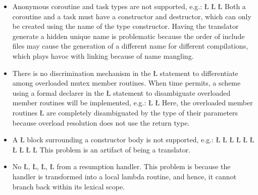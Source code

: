 \documentclass[openright,twoside]{report}
\begin{document}
\begin{itemize}
\item
Anonymous coroutine and task types are not supported, e.g.:
\LGinlinefalse\LGbegin\lgrinde
\L{}
\CE{}\L{\LB{}}
\L{}
\endlgrinde\LGend
Both a coroutine and a task must have a constructor and destructor, which can only be created using the name of the type constructor.
Having the translator generate a hidden unique name is problematic because the order of include files may cause the generation of a different name for different compilations, which plays havoc with linking because of name mangling.

\item
There is no discrimination mechanism in the \LGinlinetrue\LGbegin\lgrinde\L{}\endlgrinde\LGend{} statement to differentiate among overloaded mutex member routines.
When time permits, a scheme using a formal declarer in the \LGinlinetrue\LGbegin\lgrinde\L{}\endlgrinde\LGend{} statement to disambiguate overloaded member routines will be implemented, e.g.:
\LGinlinefalse\LGbegin\lgrinde
\L{}
\L{}
\endlgrinde\LGend
Here, the overloaded member routines \LGinlinetrue\LGbegin\lgrinde\L{}\endlgrinde\LGend{} are completely disambiguated by the type of their parameters because \CC overload resolution does not use the return type.

\item
A \LGinlinetrue\LGbegin\lgrinde\L{}\endlgrinde\LGend{} block surrounding a constructor body is not supported, e.g.:
\LGinlinefalse\LGbegin\lgrinde
\L{}
\L{\LB{}}
\L{}
\L{\LB{}}
\CE{}\L{\LB{\};}}
\L{}
\L{\LB{}}
\CE{}\L{}
\L{\LB{}}
\CE{}\L{\LB{\}}}
\endlgrinde\LGend
This problem is an artifact of \uC being a translator.
\item
No \LGinlinetrue\LGbegin\lgrinde\L{}\endlgrinde\LGend{}, \LGinlinetrue\LGbegin\lgrinde\L{}\endlgrinde\LGend{}, \LGinlinetrue\LGbegin\lgrinde\L{}\endlgrinde\LGend{}, \LGinlinetrue\LGbegin\lgrinde\L{}\endlgrinde\LGend{} from a resumption handler.
This problem is because the handler is transformed into a local lambda routine, and hence, it cannot branch back within its lexical scope.
\end{itemize}
\end{document}
